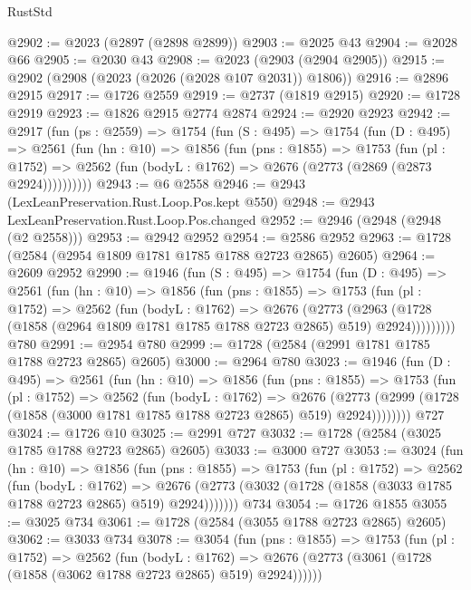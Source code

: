 \begin{lexlean}{RustStd}
\begin{coremodule}
{\begin{coremodule}
{{{{{{{{{{{{{@2902 := @2023 (@2897 (@2898 @2899))
@2903 := @2025 @43
@2904 := @2028 @66
@2905 := @2030 @43
@2908 := @2023 (@2903 (@2904 @2905))
@2915 := @2902 (@2908 (@2023 (@2026 (@2028 @107 @2031)) @1806))
@2916 := @2896 @2915
@2917 := @1726 @2559
@2919 := @2737 (@1819 @2915)
@2920 := @1728 @2919
@2923 := @1826 @2915 @2774 @2874
@2924 := @2920 @2923
@2942 := @2917
    (fun (ps : @2559) =>
    @1754
      (fun (S : @495) =>
      @1754
        (fun (D : @495) =>
        @2561
          (fun (hn : @10) =>
          @1856
            (fun (pns : @1855) =>
            @1753
              (fun (pl : @1752) =>
              @2562 (fun (bodyL : @1762) => @2676 (@2773 (@2869 (@2873 @2924))))))))))
@2943 := @6 @2558
@2946 := @2943 (LexLeanPreservation.Rust.Loop.Pos.kept @550)
@2948 := @2943 LexLeanPreservation.Rust.Loop.Pos.changed
@2952 := @2946 (@2948 (@2948 (@2 @2558)))
@2953 := @2942 @2952
@2954 := @2586 @2952
@2963 := @1728 (@2584 (@2954 @1809 @1781 @1785 @1788 @2723 @2865) @2605)
@2964 := @2609 @2952
@2990 := @1946
    (fun (S : @495) =>
    @1754
      (fun (D : @495) =>
      @2561
        (fun (hn : @10) =>
        @1856
          (fun (pns : @1855) =>
          @1753
            (fun (pl : @1752) =>
            @2562
              (fun (bodyL : @1762) =>
              @2676
                (@2773
                  (@2963
                    (@1728 (@1858 (@2964 @1809 @1781 @1785 @1788 @2723 @2865) @519) @2924)))))))))
    @780
@2991 := @2954 @780
@2999 := @1728 (@2584 (@2991 @1781 @1785 @1788 @2723 @2865) @2605)
@3000 := @2964 @780
@3023 := @1946
    (fun (D : @495) =>
    @2561
      (fun (hn : @10) =>
      @1856
        (fun (pns : @1855) =>
        @1753
          (fun (pl : @1752) =>
          @2562
            (fun (bodyL : @1762) =>
            @2676
              (@2773 (@2999 (@1728 (@1858 (@3000 @1781 @1785 @1788 @2723 @2865) @519) @2924))))))))
    @727
@3024 := @1726 @10
@3025 := @2991 @727
@3032 := @1728 (@2584 (@3025 @1785 @1788 @2723 @2865) @2605)
@3033 := @3000 @727
@3053 := @3024
    (fun (hn : @10) =>
    @1856
      (fun (pns : @1855) =>
      @1753
        (fun (pl : @1752) =>
        @2562
          (fun (bodyL : @1762) =>
          @2676 (@2773 (@3032 (@1728 (@1858 (@3033 @1785 @1788 @2723 @2865) @519) @2924)))))))
    @734
@3054 := @1726 @1855
@3055 := @3025 @734
@3061 := @1728 (@2584 (@3055 @1788 @2723 @2865) @2605)
@3062 := @3033 @734
@3078 := @3054
    (fun (pns : @1855) =>
    @1753
      (fun (pl : @1752) =>
      @2562
        (fun (bodyL : @1762) =>
        @2676 (@2773 (@3061 (@1728 (@1858 (@3062 @1788 @2723 @2865) @519) @2924))))))
}}}}}}}}}}}}}
\end{coremodule}}
\end{coremodule}
\end{lexlean}
